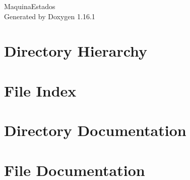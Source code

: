 \documentclass[twoside]{book}
\newcommand{\+}{\discretionary{\mbox{\scriptsize$\hookleftarrow$}}{}{}}
\newcommand{\clearemptydoublepage}{%
    \newpage{\pagestyle{empty}\cleardoublepage}%
  }
\begin{document}
  \raggedbottom
    \hypersetup{pageanchor=false,
                bookmarksnumbered=true,
                pdfencoding=unicode
               }
  \begin{titlepage}
  \vspace*{7cm}
  \begin{center}%
  {\Large Maquina\+Estados}\\
  \vspace*{1cm}
  {\large Generated by Doxygen 1.16.1}\\
  \end{center}
  \end{titlepage}
  \clearemptydoublepage
  \tableofcontents
  \clearemptydoublepage
  \hypersetup{pageanchor=true}
\chapter{Directory Hierarchy}

\chapter{File Index}

\chapter{Directory Documentation}

\chapter{File Documentation}












  \backmatter
  \newpage
  \clearemptydoublepage
  \printindex
\end{document}
